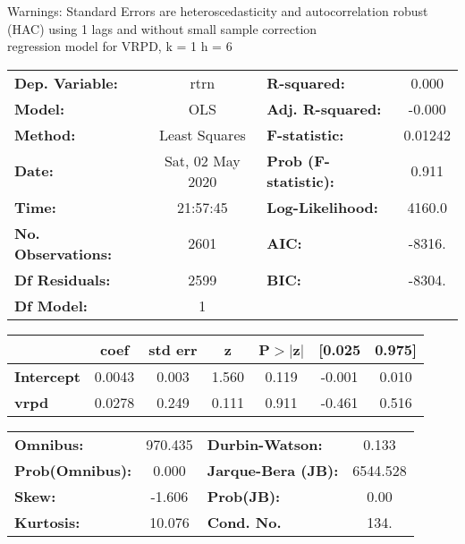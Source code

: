 Warnings: \newline
 [1] Standard Errors are heteroscedasticity and autocorrelation robust (HAC) using 1 lags and without small sample correction\\ 

regression model for VRPD, k = 1 h = 6\begin{center}
\begin{tabular}{lclc}
\toprule
\textbf{Dep. Variable:}    &       rtrn       & \textbf{  R-squared:         } &     0.000   \\
\textbf{Model:}            &       OLS        & \textbf{  Adj. R-squared:    } &    -0.000   \\
\textbf{Method:}           &  Least Squares   & \textbf{  F-statistic:       } &   0.01242   \\
\textbf{Date:}             & Sat, 02 May 2020 & \textbf{  Prob (F-statistic):} &    0.911    \\
\textbf{Time:}             &     21:57:45     & \textbf{  Log-Likelihood:    } &    4160.0   \\
\textbf{No. Observations:} &        2601      & \textbf{  AIC:               } &    -8316.   \\
\textbf{Df Residuals:}     &        2599      & \textbf{  BIC:               } &    -8304.   \\
\textbf{Df Model:}         &           1      & \textbf{                     } &             \\
\bottomrule
\end{tabular}
\begin{tabular}{lcccccc}
                   & \textbf{coef} & \textbf{std err} & \textbf{z} & \textbf{P$> |$z$|$} & \textbf{[0.025} & \textbf{0.975]}  \\
\midrule
\textbf{Intercept} &       0.0043  &        0.003     &     1.560  &         0.119        &       -0.001    &        0.010     \\
\textbf{vrpd}      &       0.0278  &        0.249     &     0.111  &         0.911        &       -0.461    &        0.516     \\
\bottomrule
\end{tabular}
\begin{tabular}{lclc}
\textbf{Omnibus:}       & 970.435 & \textbf{  Durbin-Watson:     } &    0.133  \\
\textbf{Prob(Omnibus):} &   0.000 & \textbf{  Jarque-Bera (JB):  } & 6544.528  \\
\textbf{Skew:}          &  -1.606 & \textbf{  Prob(JB):          } &     0.00  \\
\textbf{Kurtosis:}      &  10.076 & \textbf{  Cond. No.          } &     134.  \\
\bottomrule
\end{tabular}
\end{center}

